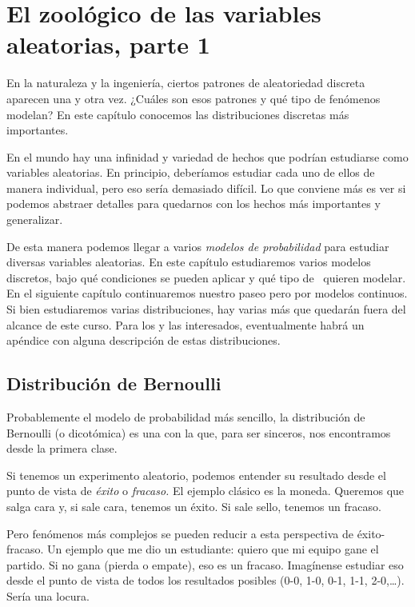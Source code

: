 \chapter{El zoológico de las variables aleatorias, parte 1}

\begin{ideanote}
En la naturaleza y la ingeniería, ciertos patrones de aleatoriedad discreta aparecen una y otra vez. ¿Cuáles son esos patrones y qué tipo de fenómenos modelan? En este capítulo conocemos las distribuciones discretas más importantes.
\end{ideanote}

En el mundo hay una infinidad y variedad de hechos que podrían estudiarse como variables aleatorias. En principio, deberíamos estudiar cada uno de ellos de manera individual, pero eso sería demasiado difícil. Lo que conviene más es ver si podemos abstraer detalles para quedarnos con los hechos más importantes y generalizar.

De esta manera podemos llegar a varios \emph{modelos de probabilidad} para estudiar diversas variables aleatorias. En este capítulo estudiaremos varios modelos discretos, bajo qué condiciones se pueden aplicar y qué tipo de \va\ quieren modelar. En el siguiente capítulo continuaremos nuestro paseo pero por modelos continuos. Si bien estudiaremos varias distribuciones, hay varias más que quedarán fuera del alcance de este curso. Para los y las interesados, eventualmente habrá un apéndice con alguna descripción de estas distribuciones.

\section{Distribución de Bernoulli}

Probablemente el modelo de probabilidad más sencillo, la distribución de Bernoulli (o dicotómica) es una con la que, para ser sinceros, nos encontramos desde la primera clase.

Si tenemos un experimento aleatorio, podemos entender su resultado desde el punto de vista de \emph{éxito} o \emph{fracaso.} El ejemplo clásico es la moneda. Queremos que salga cara y, si sale cara, tenemos un éxito. Si sale sello, tenemos un fracaso.

Pero fenómenos más complejos se pueden reducir a esta perspectiva de éxito-fracaso. Un ejemplo que me dio un estudiante: quiero que mi equipo gane el partido. Si no gana (pierda o empate), eso es un fracaso. Imagínense estudiar eso desde el punto de vista de todos los resultados posibles (0-0, 1-0, 0-1, 1-1, 2-0,\ldots). Sería una locura.

